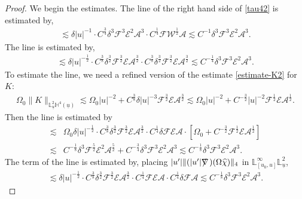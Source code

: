\documentclass[11pt,reqno]{amsart}
\theoremstyle{definition}
\numberwithin{equation}{section}
\renewcommand{\L}{\mathbb{L}}
\renewcommand{\H}{\mathbb{H}}
\def\chih{\widehat{\chi}}
\def\ub{\underline{u}}
\def\nablas{\mbox{$\nabla \mkern -13mu /$ }}
\begin{document}
\begin{proof}
We begin the estimates. The  line of the right hand side of \eqref{tau42} is estimated by, 
\begin{align*}
\lesssim\delta|u|^{-1}\cdot C^{\frac{3}{4}}\delta^3\mathscr{F}^3\mathscr{E}^2\mathcal{A}^3\cdot C^{\frac{1}{4}}\mathscr{F}\mathscr{W}^{\frac{1}{2}}\mathcal{A}\lesssim C^{-1}\delta^3\mathscr{F}^3\mathscr{E}^2\mathcal{A}^3.
\end{align*}
The  line is estimated by, \begin{align*}
\lesssim\delta|u|^{-\frac{1}{2}}\cdot C^{\frac{3}{8}}\delta^{\frac{3}{2}}\mathscr{F}^{\frac{3}{2}}\mathscr{E}\mathcal{A}^{\frac{3}{2}}\cdot C^{\frac{3}{8}}\delta^{\frac{3}{2}}\mathscr{F}^{\frac{3}{2}}\mathscr{E}\mathcal{A}^{\frac{3}{2}} \lesssim C^{-\frac{1}{4}}\delta^3\mathscr{F}^3\mathscr{E}^2\mathcal{A}^3.
\end{align*}
To estimate the  line, we need a refined version of the estimate \eqref{estimate-K2} for $K$:
\begin{align*}
\Omega_0\|K\|_{\L^2_{\ub}\H^4(\ub)}\lesssim\Omega_0|u|^{-2}+C^\frac{3}{8}\delta|u|^{-3}\mathscr{F}^{\frac{3}{2}}\mathscr{E}\mathcal{A}^{\frac{3}{2}}\lesssim\Omega_0|u|^{-2}+C^{-\frac{3}{2}}|u|^{-2}\mathscr{F}^{\frac{1}{2}}\mathscr{E}\mathcal{A}^{\frac{1}{2}}.
\end{align*}
Then the  line is estimated by
\begin{align*}
\lesssim&\Omega_0\delta|u|^{-\frac{1}{2}}\cdot C^{\frac{3}{8}}\delta^{\frac{3}{2}}\mathscr{F}^{\frac{3}{2}}\mathscr{E}\mathcal{A}^{\frac{3}{2}}\cdot C^{\frac{1}{4}}\delta\mathscr{F}\mathscr{E}\mathcal{A}\cdot[\Omega_0+C^{-\frac{3}{2}}\mathscr{F}^{\frac{1}{2}}\mathscr{E}\mathcal{A}^{\frac{1}{2}}]\\
\lesssim&C^{-\frac{1}{8}}\delta^3\mathscr{F}^{\frac{5}{2}}\mathscr{E}^2\mathcal{A}^{\frac{5}{2}}+ C^{-\frac{3}{4}}\delta^3\mathscr{F}^3\mathscr{E}^2\mathcal{A}^3\lesssim C^{-\frac{1}{8}}\delta^3\mathscr{F}^3\mathscr{E}^2\mathcal{A}^3.
\end{align*}
The  term of the  line is estimated by, placing $|u'|\|(|u'|\nablas)(\Omega\chih)\|_4$ in $\L^\infty_{[u_0,u]}\L_{\ub}^2$,
\begin{align*}
\lesssim\delta|u|^{-\frac{1}{2}}\cdot C^{\frac{3}{8}}\delta^{\frac{3}{2}}\mathscr{F}^{\frac{3}{2}}\mathscr{E}\mathcal{A}^{\frac{3}{2}}\cdot  C^{\frac{1}{4}}\mathscr{F}\mathscr{E}\mathcal{A}\cdot C^{\frac{1}{4}}\delta\mathscr{F}\mathcal{A}\lesssim C^{-\frac{1}{8}}\delta^3\mathscr{F}^3\mathscr{E}^2\mathcal{A}^3.

\end{align*}
\end{proof}
\end{document}
